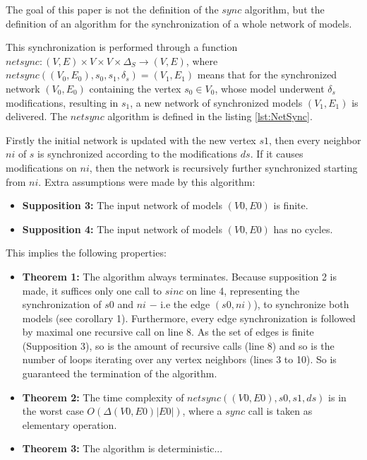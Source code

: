 \documentclass[tuberlin,cic,tc,english,noabntcite]{iiufrgs}
\begin{document}
The goal of this paper is not the definition of the $sync$ algorithm, but the definition of an algorithm for the synchronization of a whole network of models.

This synchronization is performed through a function $netsync: (V,E) \times V \times V \times \Delta_S \rightarrow (V,E)$, where $netsync ((V_0,E_0), s_0, s_1, \delta_s) = (V_1,E_1)$ means that for the synchronized network $(V_0,E_0)$ containing the vertex $s_0 \in V_0$, whose model underwent $\delta_s$ modifications, resulting in $s_1$, a new network of synchronized models $(V_1,E_1)$ is delivered. The $netsync$ algorithm is defined in the listing \ref{lst:NetSync}.



Firstly the initial network is updated with the new vertex $s1$, then every neighbor $ni$ of $s$ is synchronized according to the modifications $ds$. If it causes modifications on $ni$, then the network is recursively further synchronized starting from $ni$. Extra assumptions were made by this algorithm:

\begin{itemize}
\item \textbf{Supposition 3:} The input network of models $(V0,E0)$ is finite.

\item \textbf{Supposition 4:} The input network of models $(V0,E0)$ has no cycles.
\end{itemize}

This implies the following properties:

\begin{itemize}
\item \textbf{Theorem 1:} The algorithm always terminates. Because supposition 2 is made, it suffices only one call to $sinc$ on line 4, representing the synchronization of $s0$ and $ni$ $-$ i.e the edge $(s0,ni)$), to synchronize both models (see corollary 1). Furthermore, every edge synchronization is followed by maximal one recursive call on line 8. As the set of edges is finite (Supposition 3), so is the amount of recursive calls (line 8) and so is the number of loops iterating over any vertex neighbors (lines 3 to 10). So is guaranteed the termination of the algorithm.

\item \textbf{Theorem 2:} The time complexity of $netsync((V0,E0), s0, s1, ds)$ is in the worst case $O(\Delta(V0,E0) |E0|)$, where a $sync$ call is taken as elementary operation.

\item \textbf{Theorem 3:} The algorithm is deterministic...
\end{itemize}
\end{document}
